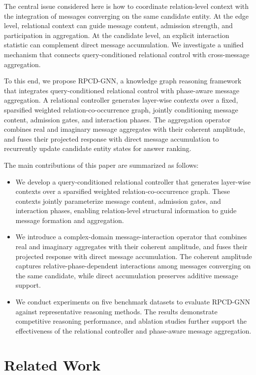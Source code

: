 \documentclass[a4paper,fleqn]{cas-dc}
\begin{document}
The central issue considered here is how to coordinate relation-level context with the integration of messages converging on the same candidate entity. At the edge level, relational context can guide message content, admission strength, and participation in aggregation. At the candidate level, an explicit interaction statistic can complement direct message accumulation. We investigate a unified mechanism that connects query-conditioned relational control with cross-message aggregation.

To this end, we propose RPCD-GNN, a knowledge graph reasoning framework that integrates query-conditioned relational control with phase-aware message aggregation. A relational controller generates layer-wise contexts over a fixed, sparsified weighted relation-co-occurrence graph, jointly conditioning message content, admission gates, and interaction phases. The aggregation operator combines real and imaginary message aggregates with their coherent amplitude, and fuses their projected response with direct message accumulation to recurrently update candidate entity states for answer ranking.

The main contributions of this paper are summarized as follows:
\begin{itemize}
\item We develop a query-conditioned relational controller that generates layer-wise contexts over a sparsified weighted relation-co-occurrence graph. These contexts jointly parameterize message content, admission gates, and interaction phases, enabling relation-level structural information to guide message formation and aggregation.
\item We introduce a complex-domain message-interaction operator that combines real and imaginary aggregates with their coherent amplitude, and fuses their projected response with direct message accumulation. The coherent amplitude captures relative-phase-dependent interactions among messages converging on the same candidate, while direct accumulation preserves additive message support.
\item We conduct experiments on five benchmark datasets to evaluate RPCD-GNN against representative reasoning methods. The results demonstrate competitive reasoning performance, and ablation studies further support the effectiveness of the relational controller and phase-aware message aggregation.
\end{itemize}

\section{Related Work}\label{sec:related-work}
\end{document}
